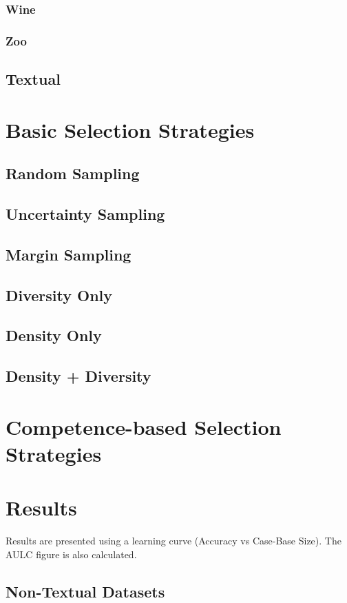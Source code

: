 \documentclass[a4paper,11pt]{report}
\begin{document}
\subsubsection*{Wine}\label{sec:wine}
\subsubsection*{Zoo}\label{sec:zoo}
\subsection{Textual}

\section{Basic Selection Strategies}
\subsection{Random Sampling}
\subsection{Uncertainty Sampling}
\subsection{Margin Sampling}
\subsection{Diversity Only}
\subsection{Density Only}
\subsection{Density + Diversity}

\section{Competence-based Selection Strategies}

\section{Results}
Results are presented using a learning curve (Accuracy vs Case-Base Size). The AULC figure is also calculated.

\subsection{Non-Textual Datasets}
\end{document}
